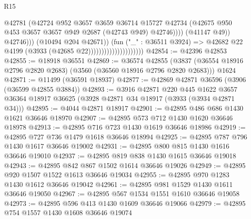 \begin{lexlean}{R15}
\begin{coremodule}
                                                      @42781
                                                      (@42724
                                                        @952
                                                        @3657
                                                        @3659
                                                        @36714
                                                        @15727
                                                        @42734
                                                        (@42675
                                                          @950
                                                          @453
                                                          @3657
                                                          @3657
                                                          @949
                                                          @2687
                                                          (@42743 @949)
                                                          @42746))))
                                                  (@41147 @49))
                                                @42746)))
                                          (@10494 @204 @42671))
                                        (fun ("_" : @36511 @3924) =>
                                        @42682 @22 @4199 (@3933 (@42685 @22)))))))))))))))))))))
@42854 := @42396 @42853
@42855 := @18918 @36551
@42869 := @36574
    @42855
    (@3837 (@36554 @18916 @2796 @2820 @2683) (@3560 (@36560 @18916 @2796 @2820 @2683)))
    @1624
@42871 := @11499 (@36591 @18937)
@42877 := @42869 @42871 @36596 (@3906 (@36599 @42855 @3884))
@42893 := @3916
    @42871
    @220
    @445
    @1622
    @3657
    @36364
    @18917
    @36625
    (@3928 @42871 @34 @18917 (@3933 (@3934 @42871 @34)))
@42895 := @4044 @42871 @18917
@42901 := @42895 @486 @686 @1430 @1621 @36646 @18970
@42907 := @42895 @573 @712 @1430 @1620 @36646 @18978
@42913 := @42895 @716 @723 @1430 @1619 @36646 @18986
@42919 := @42895 @727 @736 @1479 @1618 @36646 @18994
@42925 := @42895 @787 @796 @1430 @1617 @36646 @19002
@42931 := @42895 @800 @815 @1430 @1616 @36646 @19010
@42937 := @42895 @819 @838 @1430 @1615 @36646 @19018
@42943 := @42895 @842 @867 @1502 @1614 @36646 @19026
@42949 := @42895 @920 @1507 @1522 @1613 @36646 @19034
@42955 := @42895 @970 @1283 @1430 @1612 @36646 @19042
@42961 := @42895 @981 @1529 @1430 @1611 @36646 @19050
@42967 := @42895 @567 @1534 @1551 @1610 @36646 @19058
@42973 := @42895 @596 @413 @1430 @1609 @36646 @19066
@42979 := @42895 @754 @1557 @1430 @1608 @36646 @19074

\end{coremodule}
\end{lexlean}
